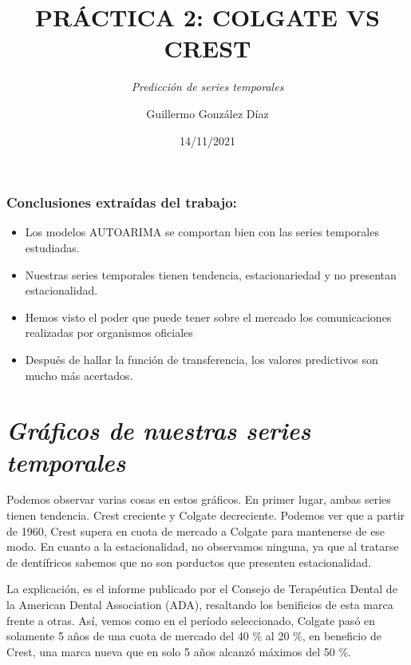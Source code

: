 \documentclass[
]{article}
\title{PRÁCTICA 2: COLGATE VS CREST}
\subtitle{\emph{Predicción de series temporales}}
\author{Guillermo González Díaz}
\date{14/11/2021}
\providecommand{\tightlist}{%
  \setlength{\itemsep}{0pt}\setlength{\parskip}{0pt}}
\begin{document}
\maketitle

{
\setcounter{tocdepth}{2}
\tableofcontents
}
\hypertarget{conclusiones-extrauxeddas-del-trabajo}{%
\subsubsection{\texorpdfstring{\textbf{Conclusiones extraídas del
trabajo:}}{Conclusiones extraídas del trabajo:}}\label{conclusiones-extrauxeddas-del-trabajo}}

\begin{itemize}
\tightlist
\item
  Los modelos AUTOARIMA se comportan bien con las series temporales
  estudiadas.
\item
  Nuestras series temporales tienen tendencia, estacionariedad y no
  presentan estacionalidad.
\item
  Hemos visto el poder que puede tener sobre el mercado los
  comunicaciones realizadas por organismos oficiales
\item
  Después de hallar la función de transferencia, los valores predictivos
  son mucho más acertados.
\end{itemize}

\hypertarget{gruxe1ficos-de-nuestras-series-temporales}{%
\section{\texorpdfstring{\emph{Gráficos de nuestras series
temporales}}{Gráficos de nuestras series temporales}}\label{gruxe1ficos-de-nuestras-series-temporales}}

Podemos observar varias cosas en estos gráficos. En primer lugar, ambas
series tienen tendencia. Crest creciente y Colgate decreciente. Podemos
ver que a partir de 1960, Crest supera en cuota de mercado a Colgate
para mantenerse de ese modo. En cuanto a la estacionalidad, no
observamos ninguna, ya que al tratarse de dentífricos sabemos que no son
porductos que presenten estacionalidad.

La explicación, es el informe publicado por el Consejo de Terapéutica
Dental de la American Dental Association (ADA), resaltando los
benificios de esta marca frente a otras. Así, vemos como en el período
seleccionado, Colgate pasó en solamente 5 años de una cuota de mercado
del 40 \% al 20 \%, en beneficio de Crest, una marca nueva que en solo 5
años alcanzó máximos del 50 \%.
\end{document}
